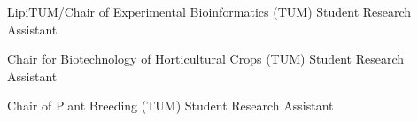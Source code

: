 {%
	LipiTUM/Chair of Experimental Bioinformatics (TUM)
}
{%
	Student Research Assistant
}
{%
}

{%
	Chair for Biotechnology of Horticultural Crops (TUM)
}
{%
	Student Research Assistant
}
{%
}

{%
	Chair of Plant Breeding (TUM)
}
{%
	Student Research Assistant
}
{%
}

